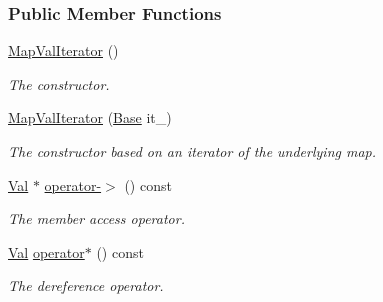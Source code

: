 \subsubsection*{Public Member Functions}
\begin{DoxyCompactItemize}
\item 
\hyperlink{structslb_1_1core_1_1util_1_1MapValIterator_a8bd52bbdbd6de2a3da8cddd9322cc996}{Map\+Val\+Iterator} ()\hypertarget{structslb_1_1core_1_1util_1_1MapValIterator_a8bd52bbdbd6de2a3da8cddd9322cc996}{}\label{structslb_1_1core_1_1util_1_1MapValIterator_a8bd52bbdbd6de2a3da8cddd9322cc996}

\begin{DoxyCompactList}\small\item\em The constructor. \end{DoxyCompactList}\item 
\hyperlink{structslb_1_1core_1_1util_1_1MapValIterator_afcbd33348eed00239d0b595e43a53fbe}{Map\+Val\+Iterator} (\hyperlink{structslb_1_1core_1_1util_1_1MapValIterator_aad1e93b1dc7d5a619b934a40d8c02a16}{Base} it\+\_\+)\hypertarget{structslb_1_1core_1_1util_1_1MapValIterator_afcbd33348eed00239d0b595e43a53fbe}{}\label{structslb_1_1core_1_1util_1_1MapValIterator_afcbd33348eed00239d0b595e43a53fbe}

\begin{DoxyCompactList}\small\item\em The constructor based on an iterator of the underlying map. \end{DoxyCompactList}\item 
\hyperlink{structslb_1_1core_1_1util_1_1MapValIterator_a35a32ef07d77b5441cd9afea0a975012}{Val} $\ast$ \hyperlink{structslb_1_1core_1_1util_1_1MapValIterator_aed95816ee4a9ffbfd708d0db9928f5df}{operator-\/$>$} () const 
\begin{DoxyCompactList}\small\item\em The member access operator. \end{DoxyCompactList}\item 
\hyperlink{structslb_1_1core_1_1util_1_1MapValIterator_a35a32ef07d77b5441cd9afea0a975012}{Val} \hyperlink{structslb_1_1core_1_1util_1_1MapValIterator_a8513fb6cdcece3acf06e49707c1e8abe}{operator$\ast$} () const 
\begin{DoxyCompactList}\small\item\em The dereference operator. \end{DoxyCompactList}\end{DoxyCompactItemize}


